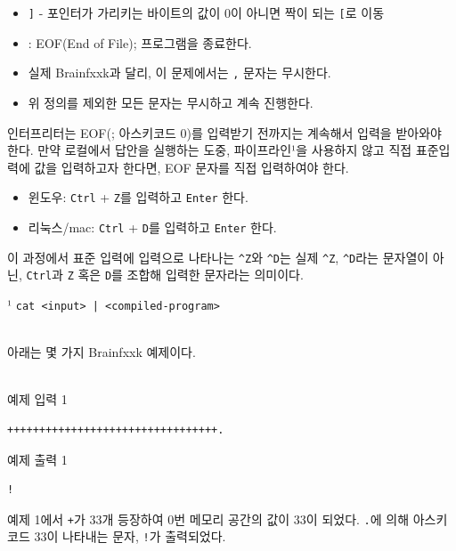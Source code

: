 \begin{enumerate}
\begin{itemize}
\item 
\texttt{]} - 포인터가 가리키는 바이트의 값이 0이 아니면 짝이 되는 \texttt{[}로 이동


\item 
\texttt{\0} : EOF(End of File); 프로그램을 종료한다.


\item 
실제 Brainfxxk과 달리, 이 문제에서는 \texttt{,} 문자는 무시한다.


\item 
위 정의를 제외한 모든 문자는 무시하고 계속 진행한다.


\end{itemize}

\end{enumerate}

인터프리터는 EOF(\texttt{\0}; 아스키코드 0)를 입력받기 전까지는 계속해서 입력을 받아와야 한다. 만약 로컬에서 답안을 실행하는 도중, 파이프라인¹을 사용하지 않고 직접 표준입력에 값을 입력하고자 한다면, EOF 문자를 직접 입력하여야 한다.

\begin{itemize}
\item 
윈도우: \texttt{Ctrl} + \texttt{Z}를 입력하고 \texttt{Enter} 한다.


\item 
리눅스/mac: \texttt{Ctrl} + \texttt{D}를 입력하고 \texttt{Enter} 한다.


\end{itemize}

이 과정에서 표준 입력에 입력으로 나타나는 \texttt{^Z}와 \texttt{^D}는 실제 \texttt{^Z}, \texttt{^D}라는 문자열이 아닌, \texttt{Ctrl}과 \texttt{Z} 혹은 \texttt{D}를 조합해 입력한 문자라는 의미이다.


¹ \texttt{cat <input> | <compiled-program>}

\\

아래는 몇 가지 Brainfxxk 예제이다.

\\

예제 입력 1

\begin{lstlisting}
+++++++++++++++++++++++++++++++++.
\end{lstlisting}

예제 출력 1

\begin{lstlisting}
!
\end{lstlisting}

예제 1에서 \texttt{+}가 33개 등장하여 0번 메모리 공간의 값이 33이 되었다. \texttt{.}에 의해 아스키코드 33이 나타내는 문자, \texttt{!}가 출력되었다.

